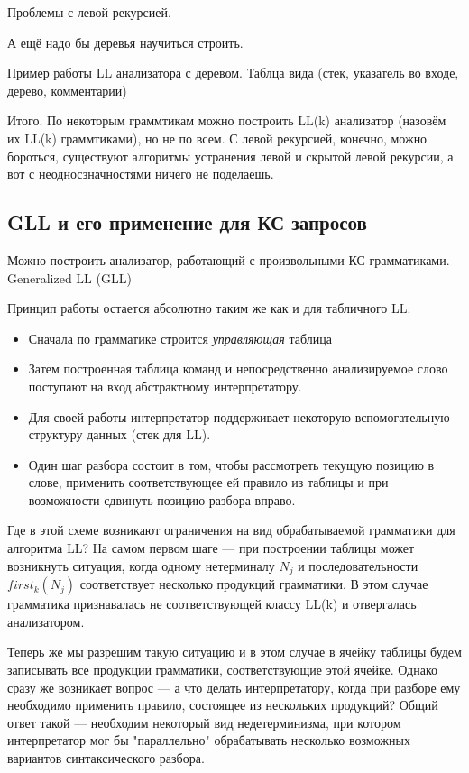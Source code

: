 Проблемы с левой рекурсией.

А ещё надо бы деревья научиться строить.

\begin{example}Пример работы LL анализатора с деревом.
  Таблца вида (стек, указатель во входе, дерево, комментарии)
\end{example}

Итого. По некоторым граммтикам можно построить LL(k) анализатор (назовём их LL(k) граммтиками), но не по всем.
С левой рекурсией, конечно, можно бороться, существуют алгоритмы устранения левой и скрытой левой рекурсии, а вот с неодносзначностями ничего не поделаешь.



\subsection{GLL и его применение для КС запросов}

Можно построить анализатор, работающий с произвольными КС-грамматиками.
Generalized LL (GLL)~\cite{Scott:2010:GP:1860132.1860320,10.1007/978-3-662-46663-6_5}

Принцип работы остается абсолютно таким же как и для табличного LL: 
\begin{itemize}
  \item Сначала по грамматике строится \textit{управляющая} таблица
  \item Затем построенная таблица команд и непосредственно анализируемое слово поступают на вход абстрактному интерпретатору.
  \item Для своей работы интерпретатор поддерживает некоторую вспомогательную структуру данных (стек для LL).
  \item Один шаг разбора состоит в том, чтобы рассмотреть текущую позицию в слове, применить соответствующее ей правило из таблицы и при возможности сдвинуть позицию разбора вправо.
\end{itemize}

Где в этой схеме возникают ограничения на вид обрабатываемой грамматики для алгоритма LL? На самом первом шаге --- при построении таблицы может возникнуть ситуация, когда одному нетерминалу $N_j$ и последовательности $first_k(N_j)$ соответствует несколько продукций грамматики. В этом случае грамматика признавалась не соответствующей классу LL(k) и отвергалась анализатором.

Теперь же мы разрешим такую ситуацию и в этом случае в ячейку таблицы будем записывать все продукции грамматики, соответствующие этой ячейке. Однако сразу же возникает вопрос --- а что делать интерпретатору, когда при разборе ему необходимо применить правило, состоящее из нескольких продукций? Общий ответ такой --- необходим некоторый вид недетерминизма, при котором интерпретатор мог бы "параллельно" обрабатывать несколько возможных вариантов синтаксического разбора.


